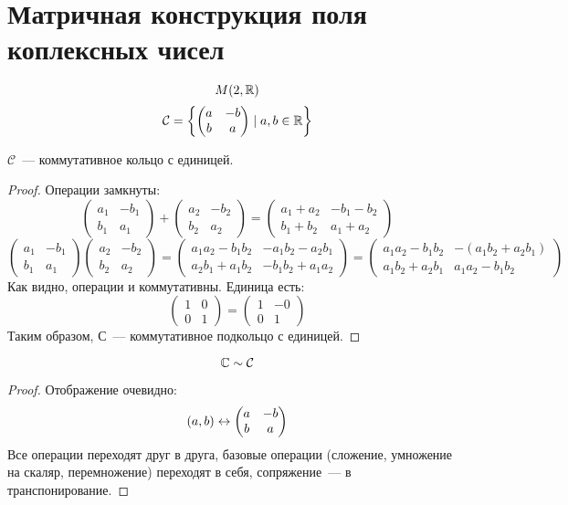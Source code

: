 \section{Матричная конструкция поля коплексных чисел}

$$M(2, \mathbb{R})$$
$$\mathcal{C} = \left\{\left(\begin{matrix}a & -b \\ b & a\end{matrix}\right) \mid a, b \in \mathbb{R}\right\}$$

\begin{assertion}
$\mathcal{C}$~--- коммутативное кольцо с единицей.
\end{assertion}
\begin{proof}
Операции замкнуты:
$$\left(\begin{matrix}a_1 & -b_1 \\ b_1 & a_1\end{matrix}\right) + \left(\begin{matrix}a_2 & -b_2 \\ b_2 & a_2\end{matrix}\right) = \left(\begin{matrix}a_1+a_2 & -b_1-b_2 \\ b_1+b_2 & a_1+a_2\end{matrix}\right)$$
$$\left(\begin{matrix}a_1 & -b_1 \\ b_1 & a_1\end{matrix}\right) \left(\begin{matrix}a_2 & -b_2 \\ b_2 & a_2\end{matrix}\right) = \left(\begin{matrix}a_1a_2-b_1b_2 & -a_1b_2-a_2b_1 \\ a_2b_1+a_1b_2 & -b_1b_2+a_1a_2\end{matrix}\right) = \left(\begin{matrix}a_1a_2-b_1b_2 & -(a_1b_2+a_2b_1) \\ a_1b_2+a_2b_1 & a_1a_2-b_1b_2\end{matrix}\right)$$
Как видно, операции и коммутативны.
Единица есть:
$$\left(\begin{matrix}1 & 0 \\ 0 & 1\end{matrix}\right) = \left(\begin{matrix}1 & -0 \\ 0 & 1\end{matrix}\right)$$
Таким образом, $\mathcal{С}$~--- коммутативное подкольцо с единицей.
\end{proof}

\begin{assertion}
$$\mathbb{C} \sim \mathcal{C}$$
\end{assertion}
\begin{proof}
Отображение очевидно:
$$(a, b) \leftrightarrow \left(\begin{matrix}a & -b \\ b & a\end{matrix}\right)$$
Все операции переходят друг в друга, базовые операции (сложение, умножение на скаляр, перемножение) переходят в себя, сопряжение~--- в транспонирование.
\end{proof}

